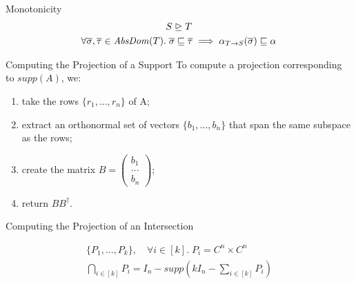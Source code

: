 \documentclass[11pt,svgnames,smaller,aspectratio=43,english]{beamer}
\begin{document}
\begin{frame}{Monotonicity}
	\begin{gather*}
		S \trianglerighteq T\\
		\forall \overline{\sigma}, \overline{\tau} \in \mathit{AbsDom}(T).\; \overline{\sigma} \sqsubseteq \overline{\tau} \implies \alpha_{T\rightarrow S}(\overline{\sigma})\sqsubseteq\alpha_{%
		}
	\end{gather*}
\end{frame}

\begin{frame}{Computing the Projection of a Support}
	To compute a projection corresponding to $supp(A)$, we:
	\begin{enumerate}
		\item take the rows $\{r_1, ..., r_n\}$ of A;
		\item extract an orthonormal set of vectors $\{b_1, ..., b_n\}$ that span the same subspace as the rows;
		\item create the matrix $B = \begin{pmatrix}
			b_1 \\ ... \\ b_n
		\end{pmatrix}$;
		\item return $BB^\dagger$.
	\end{enumerate}
\end{frame}

\begin{frame}{Computing the Projection of an Intersection}

	\begin{gather*}
		\{P_1, ..., P_k\},\quad \forall i\in [k].\; P_i = C^n \times C^n\\
		\bigcap_{i\in [k]} P_i = I_n - supp(kI_n - \sum_{i\in [k]} P_i)
	\end{gather*}
\end{frame}


\end{document}
